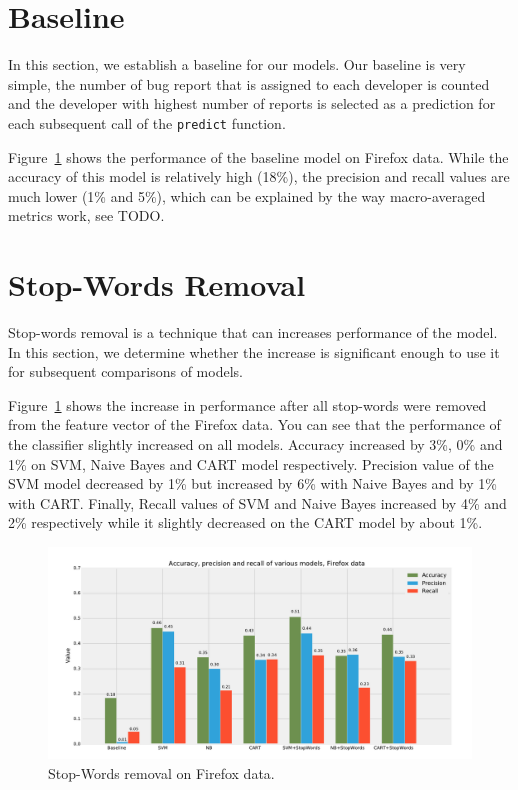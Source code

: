 \section{Baseline}
\label{section:baseline}

In this section, we establish a baseline for our models. Our baseline is very simple, the number of bug report that is assigned to each developer is counted and the developer with highest number of reports is selected as a prediction for each subsequent call of the \texttt{predict} function.

Figure~\ref{fig:models.firefox.stopwords} shows the performance of the baseline model on Firefox data. While the accuracy of this model is relatively high (18\%), the precision and recall values are much lower (1\% and 5\%), which can be explained by the way macro-averaged metrics work, see TODO. 

\section{Stop-Words Removal}

Stop-words removal is a technique that can increases performance of the model. In this section, we determine whether the increase is significant enough to use it for subsequent comparisons of models.

Figure~\ref{fig:models.firefox.stopwords} shows the increase in performance after all stop-words were removed from the feature vector of the Firefox data. You can see that the performance of the classifier slightly increased on all models. Accuracy increased by 3\%, 0\% and 1\% on SVM, Naive Bayes and CART model respectively. Precision value of the SVM model decreased by 1\% but increased by 6\% with Naive Bayes and by 1\% with CART. Finally, Recall values of SVM and Naive Bayes increased by 4\% and 2\% respectively while it slightly decreased on the CART model by about 1\%.

\begin{figure}[htbp]
    \centering
        \includegraphics[width=\textwidth]{./images/comparison_of_models/firefox_0.pdf}
    \caption{Stop-Words removal on Firefox data.}
    \label{fig:models.firefox.stopwords}
\end{figure}

